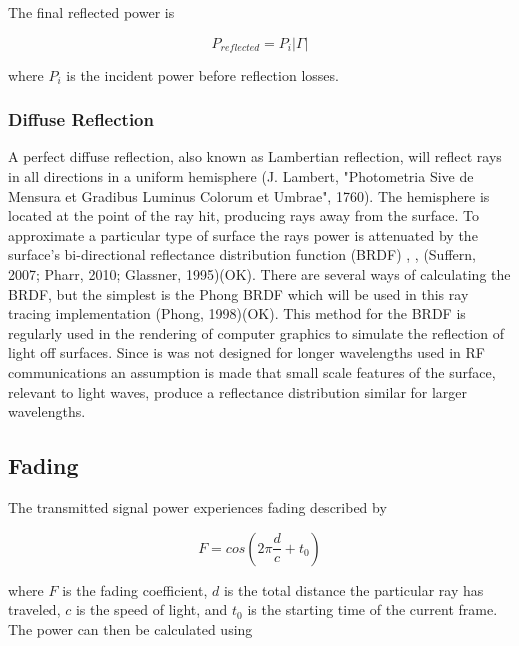 The final reflected power is

\begin{equation}
	P_{reflected} = P_i|\Gamma|
	\label{eqn:reflected_power}
\end{equation}

where $P_i$ is the incident power before reflection losses.

\subsubsection{Diffuse Reflection}
A perfect diffuse reflection, also known as Lambertian reflection, will reflect rays in all directions in a uniform hemisphere (J. Lambert, "Photometria Sive de Mensura et Gradibus Luminus Colorum et Umbrae", 1760). The hemisphere is located at the point of the ray hit, producing rays away from the surface. To approximate a particular type of surface the rays power is attenuated by the surface's bi-directional reflectance distribution function (BRDF) \cite{Suffern2007}, \cite{Pharr2010}, \cite{Glassner1995} (Suffern, 2007; Pharr, 2010; Glassner, 1995)(OK). There are several ways of calculating the BRDF, but the simplest is the Phong BRDF which will be used in this ray tracing implementation \cite{Phong:1998:ICG:280811.280980} (Phong, 1998)(OK). This method for the BRDF is regularly used in the rendering of computer graphics to simulate the reflection of light off surfaces. Since is was not designed for longer wavelengths used in RF communications an assumption is made that small scale features of the surface, relevant to light waves,  produce a reflectance distribution similar for larger wavelengths. 


\subsection{Fading}
The transmitted signal power experiences fading described by

\begin{equation}
	F = cos\left(2\pi \frac{d}{c} + t_0\right)
	\label{eqn:fading_coeff}
\end{equation}

where $F$ is the fading coefficient, $d$ is the total distance the particular ray has traveled, $c$ is the speed of light, and $t_0$ is the starting time of the current frame. The power can then be calculated using

